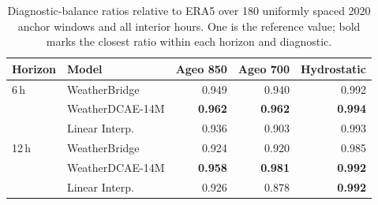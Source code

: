 \begin{table}[!htbp]
\centering
\caption{Diagnostic-balance ratios relative to ERA5 over 180 uniformly spaced 2020 anchor windows and all interior hours. One is the reference value; bold marks the closest ratio within each horizon and diagnostic.}
\label{tab:physics_balance}
\small
\setlength{\tabcolsep}{4pt}
\begin{tabular}{llrrr}
\toprule
Horizon & Model & Ageo 850 & Ageo 700 & Hydrostatic \\
\midrule
6\,h & WeatherBridge & 0.949 & 0.940 & 0.992 \\
 & WeatherDCAE-14M & \textbf{0.962} & \textbf{0.962} & \textbf{0.994} \\
 & Linear Interp. & 0.936 & 0.903 & 0.993 \\
\midrule
12\,h & WeatherBridge & 0.924 & 0.920 & 0.985 \\
 & WeatherDCAE-14M & \textbf{0.958} & \textbf{0.981} & \textbf{0.992} \\
 & Linear Interp. & 0.926 & 0.878 & \textbf{0.992} \\
\bottomrule
\end{tabular}
\end{table}
